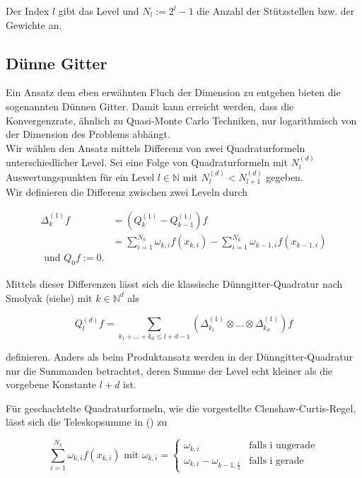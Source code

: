\documentclass[12pt,a4paper]{scrartcl}
\numberwithin{equation}{section}
\newcommand{\N}{\mathbb{N}} %
\begin{document}
{ Der Index $l$ gibt das Level und $N_l := 2^l -1$ die Anzahl der Stützstellen bzw. der Gewichte an.
 
 \subsection{Dünne Gitter}
 
 Ein Ansatz dem eben erwähnten Fluch der Dimension zu entgehen bieten die sogenannten Dünnen Gitter. 
 Damit kann erreicht werden, dass die Konvergenzrate, ähnlich zu Quasi-Monte Carlo Techniken, nur
 logarithmisch von der Dimension des Problems abhängt. \\
 
 Wir wählen den Ansatz mittels Differenz von zwei Quadraturformeln unterschiedlicher Level. Sei eine 
 Folge von Quadraturformeln mit $N_l^{(d)}$ Auswertungspunkten für ein Level $l \in \N$ mit 
 $ N_l^{(d)} < N_{l+1}^{(d)}$ gegeben. \\ 
 Wir definieren die Differenz zwischen zwei Leveln durch 
 
 \begin{equation}
 \begin{split}
  \Delta_k^{(1)}f &= (Q_k^{(1)} - Q_{k-1}^{(1)})f \\ 
  &= \sum_{i=1}^{N_k} \omega_{k,i} f(x_{k,i}) - \sum_{i=1}^{N_k} \omega_{k-1,i} f(x_{k-1,i}) \\
  \text{ und } Q_0 f := 0.
  \end{split}
 \end{equation}


  Mittels dieser Differenzen lässt sich die klassische Dünngitter-Quadratur nach Smolyak (siehe) mit $k \in \N^d$
  als 
  
  \begin{equation}
   Q_l^{(d)}f = \sum_{k_1 + ... + k_d \leq l+d-1} (\Delta_{k_1}^{(1)} \otimes ... \otimes \Delta_{k_d}^{(1)}) f
  \end{equation}
  
  definieren. Anders als beim Produktansatz werden in der Dünngitter-Quadratur nur die Summanden betrachtet, 
  deren Summe der Level echt kleiner als die vorgebene Konstante $l+d$ ist. 
  
  Für geschachtelte Quadraturformeln, wie die vorgestellte Clenshaw-Curtis-Regel, lässt sich die Teleskopsumme in ()
  zu 
  
  \begin{equation}
   \sum_{i=1}^{N_k} {\omega}_{k,i}f(x_{k,i}) \text{ mit } {\omega}_{k,i} 
   =  \begin{cases} \omega_{k,i}&\text{falls i ungerade}\\ \omega_{k,i} - \omega_{k-1,\frac{i}{2}}&\text{falls i gerade }\end{cases}
  \end{equation}
  
}
\end{document}
